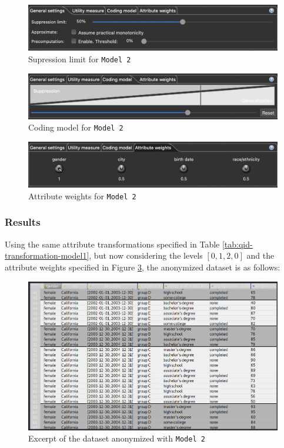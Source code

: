 \documentclass[a4paper, 11pt]{article}
\begin{document}
\begin{figure}[H]
	\centering
	\includegraphics[width=.9\textwidth]{img/supression-limit-model2.png}
	\caption{Supression limit for \texttt{Model 2}}
	\label{fig:model2-sl}
\end{figure}

\begin{figure}[H]
	\centering
	\includegraphics[width=.9\textwidth]{img/coding-model-model2.png}
	\caption{Coding model for \texttt{Model 2}}
	\label{fig:model2-cm}
\end{figure}

\begin{figure}[H]
	\centering
	\includegraphics[width=.9\textwidth]{img/attribute-weights-model2.png}
	\caption{Attribute weights for \texttt{Model 2}}
	\label{fig:model2-aw}
\end{figure}

\subsubsection{Results}

Using the same attribute transformations specified in Table 
\ref{tab:qid-transformation-model1}, but now considering the levels $[0, 1, 2, 0]$
and the attribute weights specified in Figure \ref{fig:model2-aw}, the anonymized
dataset is as follows:\\

\begin{figure}[H]
	\centering
	\includegraphics[width=\textwidth]{img/model2-output.png}
	\caption{Excerpt of the dataset anonymized with \texttt{Model 2}}
	\label{fig:model2-output}
\end{figure}
\end{document}

